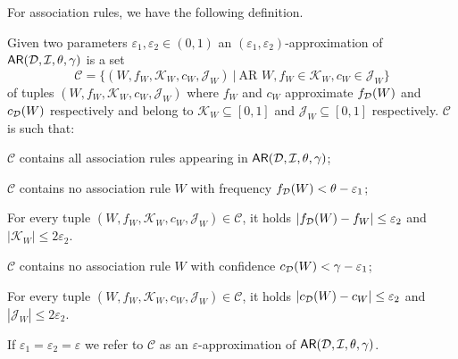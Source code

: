 For association rules, we have the following definition.
\begin{definition}\label{def:eapproxar}
  Given two parameters $\varepsilon_1,\varepsilon_2\in(0,1)$ an
  $(\varepsilon_1,\varepsilon_2)$-approximation of $\mathsf{AR}({\cal D},{\cal I},\theta,\gamma)$
  is a set \[\mathcal{C}=\{(W, f_W, \mathcal{K}_W, c_W, \mathcal{J}_W)~|~ 
  \mbox{AR } W, f_W\in\mathcal{K}_W, c_W\in\mathcal{J}_W\}\]
  of tuples $(W, f_W, \mathcal{K}_W, c_W, \mathcal{J}_W)$ where $f_W$ and $c_W$
  approximate $f_{\cal D}(W)$ and $c_{\cal D}(W)$ respectively and belong to
  $\mathcal{K}_W\subseteq[0,1]$ and
  $\mathcal{J}_W\subseteq[0,1]$ respectively. $\mathcal{C}$ is such
  that:
  \begin{enumerate*}
    \item $\mathcal{C}$ contains all association rules appearing in
      $\mathsf{AR}({\cal D},{\cal I},\theta,\gamma)$;
    \item $\mathcal{C}$ contains no association rule $W$ with frequency
      $f_{\cal D}(W)<\theta-\varepsilon_1$;
    \item For every tuple $(W, f_W,\mathcal{K}_W,
      c_W,\mathcal{J}_W)\in\mathcal{C}$, it holds
      $|f_{\cal D}(W)-f_W|\le\varepsilon_2$ and $|\mathcal{K}_W|\le 2\varepsilon_2$.
    \item $\mathcal{C}$ contains no association rule $W$ with confidence 
      $c_{\cal D}(W)<\gamma-\varepsilon_1$;
    \item For every tuple $(W, f_W,\mathcal{K}_W,
      c_W,\mathcal{J}_W)\in\mathcal{C}$, it holds
      $|c_{\cal D}(W)-c_W|\le\varepsilon_2$ and $|\mathcal{J}_W|\le 2\varepsilon_2$.
  \end{enumerate*}
    If $\varepsilon_1=\varepsilon_2=\varepsilon$ we refer to $\mathcal{C}$ 
  as an $\varepsilon$-approximation of $\mathsf{AR}({\cal D},{\cal I},\theta,\gamma)$.
\end{definition}

